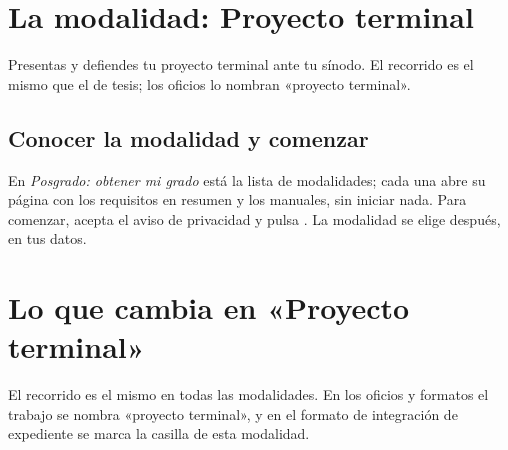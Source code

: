 \section{La modalidad: Proyecto terminal}
Presentas y defiendes tu proyecto terminal ante tu sínodo. El recorrido es el mismo que el de tesis; los oficios lo nombran «proyecto terminal».

\subsection{Conocer la modalidad y comenzar}
En \emph{Posgrado: obtener mi grado} está la lista de modalidades; cada una abre su página con los requisitos en resumen y los manuales, sin iniciar nada. Para comenzar, acepta el aviso de privacidad y pulsa . La modalidad se elige después, en tus datos.
\section{Lo que cambia en «Proyecto terminal»}
El recorrido es el mismo en todas las modalidades. En los oficios y formatos el trabajo se nombra «proyecto terminal», y en el formato de integración de expediente se marca la casilla de esta modalidad.
